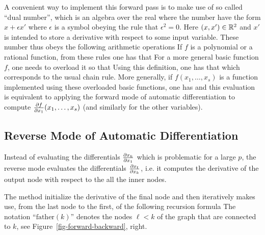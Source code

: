A convenient way to implement this forward pass is to make use of so called ``dual number'', which is an algebra over the real  where the number have the form $x + \epsilon x'$ where $\epsilon$ is a symbol obeying the rule that $\epsilon^2=0$. Here $(x,x') \in \mathbb{R}^2$ and $x'$ is intended to store a derivative with respect to some input variable. These number thus obeys the following arithmetic operations
If $f$ is a polynomial or a rational function, from these rules one has that 
For a more general basic function $f$, one needs to overload it so that
Using this definition, one has that 
which corresponds to the usual chain rule. More generally, if $f(x_1,\ldots,x_s)$ is a function implemented using these overloaded basic functions, one has  
and this evaluation is equivalent to applying the forward mode of automatic differentiation to compute $\frac{ \partial f}{\partial x_1}(x_1,\ldots,x_s)$ (and similarly for the other variables).


\subsection{Reverse Mode of Automatic Differentiation}

Instead of evaluating the differentials $\frac{ \partial x_k}{\partial x_1}$ which is problematic for a large $p$, the reverse mode evaluates the differentials  $\frac{ \partial x_t}{\partial x_k}$, i.e. it computes the derivative of the output node with respect to the all the inner nodes. 



The method initialize the derivative of the final node
and then iteratively makes use,  from the last node to the first, of the following recursion formula
%
The notation ``$\text{father}(k)$'' denotes the nodes $\ell<k$ of the graph that are connected to $k$, see Figure~\ref{fig-forward-backward}, right. 

